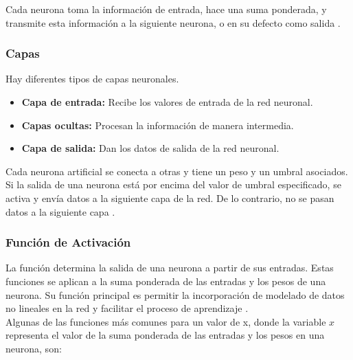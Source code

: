 \documentclass[titlepage,11pt]{article}
\begin{document}
		Cada neurona toma la información de entrada, hace una suma ponderada, y transmite esta información a la siguiente neurona, o en su defecto como salida \cite{antonio_2023_introduccin}\cite{ibm_qu}\cite{santana_2018_1}\cite{santana_2018_2}\cite{santana_2018_3}\cite{santana_2018_3_5}.
	\subsubsection{Capas}
	
		Hay diferentes tipos de capas neuronales.
		\begin{itemize}
			\item{\bf Capa de entrada:} Recibe los valores de entrada de la red neuronal.
			\item {\bf Capas ocultas:} Procesan la información de manera intermedia.
			\item{\bf Capa de salida:} Dan los datos de salida de la red neuronal.
		\end{itemize}
		
		Cada neurona artificial se conecta a otras y tiene un peso y un umbral asociados. Si la salida de una neurona está por encima del valor de umbral especificado, se activa y envía datos a la siguiente capa de la red. De lo contrario, no se pasan datos a la siguiente capa \cite{antonio_2023_introduccin}\cite{ibm_qu}\cite{santana_2018_1}\cite{santana_2018_2}\cite{santana_2018_3}\cite{santana_2018_3_5}.
	
	\subsubsection{Función de Activación}
	
		La función determina la salida de una neurona a partir de sus entradas. Estas funciones se aplican a la suma ponderada de las entradas y los pesos de una neurona. Su función principal es permitir la incorporación de modelado de datos no lineales en la red y facilitar el proceso de aprendizaje \cite{wikipediacontributors_2018_activation}.\\
		
		Algunas de las funciones más comunes para un valor de x, donde  la variable $x$ representa el valor de la suma ponderada de las entradas y los pesos en una neurona, son:
		
\end{document}
